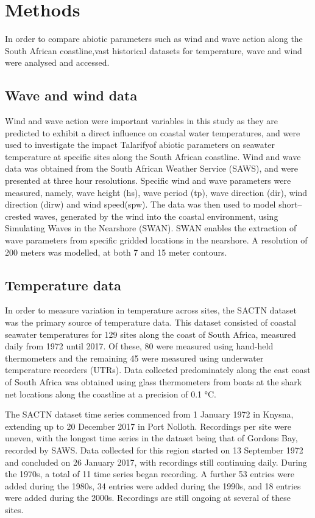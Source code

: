 \documentclass[12pt,]{article}
\begin{document}
\newpage

\section{Methods}\label{methods}

In order to compare abiotic parameters such as wind and wave action
along the South African coastline,vast historical datasets for
temperature, wave and wind were analysed and accessed.

\subsection{Wave and wind data}\label{wave-and-wind-data}

Wind and wave action were important variables in this study as they are
predicted to exhibit a direct influence on coastal water temperatures,
and were used to investigate the impact Talarifyof abiotic parameters on
seawater temperature at specific sites along the South African
coastline. Wind and wave data was obtained from the South African
Weather Service (SAWS), and were presented at three hour resolutions.
Specific wind and wave parameters were measured, namely, wave height
(hs), wave period (tp), wave direction (dir), wind direction (dirw) and
wind speed(spw). The data was then used to model short--crested waves,
generated by the wind into the coastal environment, using Simulating
Waves in the Nearshore (SWAN). SWAN enables the extraction of wave
parameters from specific gridded locations in the nearshore. A
resolution of 200 meters was modelled, at both 7 and 15 meter contours.

\subsection{Temperature data}\label{temperature-data}

In order to measure variation in temperature across sites, the SACTN
dataset was the primary source of temperature data. This dataset
consisted of coastal seawater temperatures for 129 sites along the coast
of South Africa, measured daily from 1972 until 2017. Of these, 80 were
measured using hand-held thermometers and the remaining 45 were measured
using underwater temperature recorders (UTRs). Data collected
predominately along the east coast of South Africa was obtained using
glass thermometers from boats at the shark net locations along the
coastline at a precision of 0.1 °C.

The SACTN dataset time series commenced from 1 January 1972 in Knysna,
extending up to 20 December 2017 in Port Nolloth. Recordings per site
were uneven, with the longest time series in the dataset being that of
Gordons Bay, recorded by SAWS. Data collected for this region started on
13 September 1972 and concluded on 26 January 2017, with recordings
still continuing daily. During the 1970s, a total of 11 time series
began recording. A further 53 entries were added during the 1980s, 34
entries were added during the 1990s, and 18 entries were added during
the 2000s. Recordings are still ongoing at several of these sites.
\end{document}
